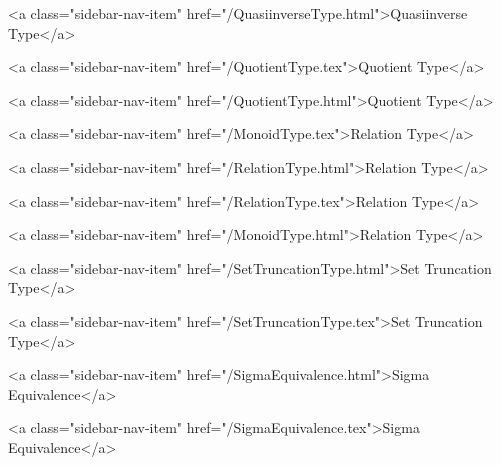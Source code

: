       
    
      
        
          <a class="sidebar-nav-item" href="/QuasiinverseType.html">Quasiinverse Type</a>
        
      
    
      
        
          <a class="sidebar-nav-item" href="/QuotientType.tex">Quotient Type</a>
        
      
    
      
        
          <a class="sidebar-nav-item" href="/QuotientType.html">Quotient Type</a>
        
      
    
      
        
          <a class="sidebar-nav-item" href="/MonoidType.tex">Relation Type</a>
        
      
    
      
        
          <a class="sidebar-nav-item" href="/RelationType.html">Relation Type</a>
        
      
    
      
        
          <a class="sidebar-nav-item" href="/RelationType.tex">Relation Type</a>
        
      
    
      
        
          <a class="sidebar-nav-item" href="/MonoidType.html">Relation Type</a>
        
      
    
      
        
          <a class="sidebar-nav-item" href="/SetTruncationType.html">Set Truncation Type</a>
        
      
    
      
        
          <a class="sidebar-nav-item" href="/SetTruncationType.tex">Set Truncation Type</a>
        
      
    
      
        
          <a class="sidebar-nav-item" href="/SigmaEquivalence.html">Sigma Equivalence</a>
        
      
    
      
        
          <a class="sidebar-nav-item" href="/SigmaEquivalence.tex">Sigma Equivalence</a>
        

